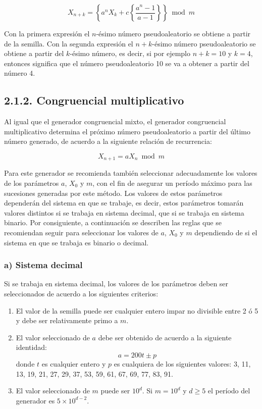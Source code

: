 \documentclass[11pt,letterpaper]{report}
\begin{document}
\begin{equation}
X_{n+k} = \left\{ a^n X_k + c \left\{ \frac{a^n - 1}{a-1} \right\} \right\} \bmod m
\end{equation}

Con la primera expresión el $n$-ésimo número pseudoaleatorio se obtiene
a partir de la semilla. Con la segunda expresión el $n+k$-ésimo número
pseudoaleatorio se obtiene a partir del $k$-ésimo número, es decir, si
por ejemplo $n+k=10$ y $k=4$, entonces significa que el número
pseudoaleatorio 10 se va a obtener a partir del número 4.

\subsection*{2.1.2. Congruencial multiplicativo}

Al igual que el generador congruencial mixto, el generador congruencial
multiplicativo determina el próximo número pseudoaleatorio a partir del
último número generado, de acuerdo a la siguiente relación de
recurrencia:

\begin{equation}
X_{n+1} = aX_n \bmod m
\end{equation}

Para este generador se recomienda también seleccionar adecuadamente los
valores de los parámetros $a$, $X_0$ y $m$, con el fin de asegurar un
período máximo para las sucesiones generadas por este método. Los
valores de estos parámetros dependerán del sistema en que se trabaje, es
decir, estos parámetros tomarán valores distintos si se trabaja en
sistema decimal, que si se trabaja en sistema binario. Por consiguiente,
a continuación se describen las reglas que se recomiendan seguir para
seleccionar los valores de $a$, $X_0$ y $m$ dependiendo de si el sistema
en que se trabaja es binario o decimal.

\subsubsection*{a) Sistema decimal}

Si se trabaja en sistema decimal, los valores de los parámetros deben
ser seleccionados de acuerdo a los siguientes criterios:

\begin{enumerate}
\item El valor de la semilla puede ser cualquier entero impar no
divisible entre 2 ó 5 y debe ser relativamente primo a $m$.
\item El valor seleccionado de $a$ debe ser obtenido de acuerdo a la
siguiente identidad:
\begin{equation}
a = 200t \pm p
\end{equation}
donde $t$ es cualquier entero y $p$ es cualquiera de los siguientes
valores: 3, 11, 13, 19, 21, 27, 29, 37, 53, 59, 61, 67, 69, 77, 83, 91.
\item El valor seleccionado de $m$ puede ser $10^d$. Si $m=10^d$ y
$d \ge 5$ el período del generador es $5 \times 10^{d-2}$.
\end{enumerate}
\end{document}
